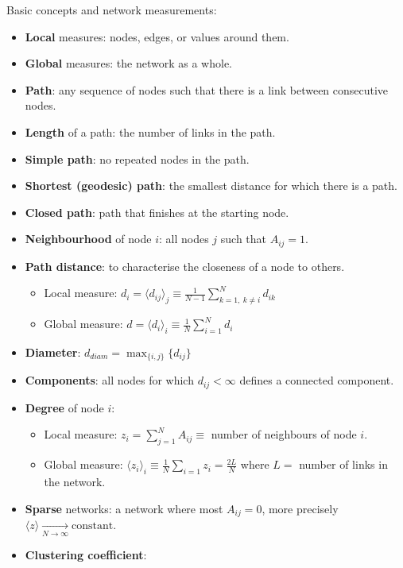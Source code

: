 \documentclass[12pt]{article}
\theoremstyle{definition}
\begin{document}
Basic concepts and network measurements: 
\begin{itemize}
    \item \textbf{Local} measures: nodes, edges, or values around them. 
    \item \textbf{Global} measures: the network as a whole. 
    \item \textbf{Path}: any sequence of nodes such that there is a link between consecutive nodes. 
    \item \textbf{Length} of a path: the number of links in the path. 
    \item \textbf{Simple path}: no repeated nodes in the path. 
    \item \textbf{Shortest (geodesic) path}: the smallest distance for which there is a path. 
    \item \textbf{Closed path}: path that finishes at the starting node. 
    \item \textbf{Neighbourhood} of node $i$: all nodes $j$ such that $A_{ij}=1$. 
    \item \textbf{Path distance}: to characterise the closeness of a node to others. 
    \begin{itemize}
        \item Local measure: $d_i=\langle d_{ij}\rangle_j\equiv\frac{1}{N-1}\sum_{k=1,\ k\neq i}^Nd_{ik}$
        \item Global measure: $d=\langle d_{i}\rangle_i\equiv\frac{1}{N}\sum_{i=1}^Nd_{i}$
    \end{itemize}
    \item \textbf{Diameter}: $d_{diam}=\max_{\{i,j\}}\{d_{ij}\}$
    \item \textbf{Components}: all nodes for which $d_{ij}<\infty$ defines a connected component. 
    \item \textbf{Degree} of node $i$: 
    \begin{itemize}
        \item Local measure: $z_i=\sum_{j=1}^N A_{ij}\equiv$ number of neighbours of node $i$. 
        \item Global measure: $\langle z_i\rangle_i\equiv \frac{1}{N}\sum_{i=1}z_i=\frac{2L}{N}$ where $L=$ number of links in the network. 
    \end{itemize}
    \item \textbf{Sparse} networks: a network where most $A_{ij}=0$, more precisely $\langle z\rangle\xrightarrow[N\rightarrow\infty]{}\text{constant}$. 
    \item \textbf{Clustering coefficient}: 
    \begin{itemize}

\end{itemize}
\end{itemize}
\end{document}
